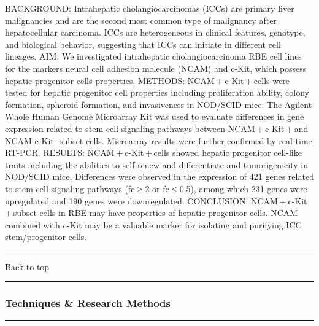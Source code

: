 \documentclass[]{article}
\begin{document}
BACKGROUND: Intrahepatic cholangiocarcinomas (ICCs) are primary liver
malignancies and are the second most common type of malignancy after
hepatocellular carcinoma. ICCs are heterogeneous in clinical features,
genotype, and biological behavior, suggesting that ICCs can initiate in
different cell lineages. AIM: We investigated intrahepatic
cholangiocarcinoma RBE cell lines for the markers neural cell adhesion
molecule (NCAM) and c-Kit, which possess hepatic progenitor cells
properties. METHODS: NCAM + c-Kit + cells were tested for hepatic
progenitor cell properties including proliferation ability, colony
formation, spheroid formation, and invasiveness in NOD/SCID mice. The
Agilent Whole Human Genome Microarray Kit was used to evaluate
differences in gene expression related to stem cell signaling pathways
between NCAM + c-Kit + and NCAM-c-Kit- subset cells. Microarray results
were further confirmed by real-time RT-PCR. RESULTS:
NCAM + c-Kit + cells showed hepatic progenitor cell-like traits
including the abilities to self-renew and differentiate and
tumorigenicity in NOD/SCID mice. Differences were observed in the
expression of 421 genes related to stem cell signaling pathways (fc ≥ 2
or fc ≤ 0.5), among which 231 genes were upregulated and 190 genes were
downregulated. CONCLUSION: NCAM + c-Kit + subset cells in RBE may have
properties of hepatic progenitor cells. NCAM combined with c-Kit may be
a valuable marker for isolating and purifying ICC stem/progenitor cells.

{}

{}

\begin{center}\rule{0.5\linewidth}{\linethickness}\end{center}

Back to top

\begin{center}\rule{0.5\linewidth}{\linethickness}\end{center}

\pagebreak

\hypertarget{techniques-research-methods}{%
\subsubsection{Techniques \& Research
Methods}\label{techniques-research-methods}}

\begin{center}\rule{0.5\linewidth}{\linethickness}\end{center}
\end{document}
